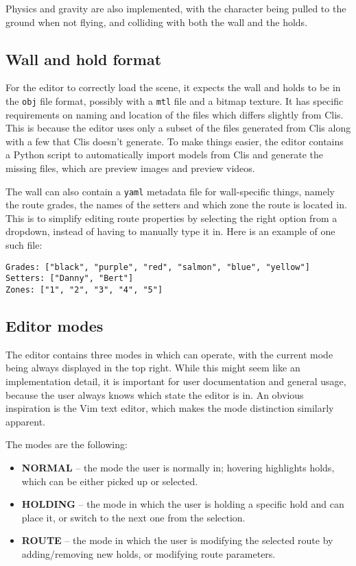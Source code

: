 Physics and gravity are also implemented, with the character being pulled to the ground when not flying, and colliding with both the wall and the holds.

\subsection{Wall and hold format}
For the editor to correctly load the scene, it expects the wall and holds to be in the \verb|obj| file format, possibly with a \verb|mtl| file and a bitmap texture.
It has specific requirements on naming and location of the files which differs slightly from Clis.
This is because the editor uses only a subset of the files generated from Clis along with a few that Clis doesn't generate.
To make things easier, the editor contains a Python script to automatically import models from Clis and generate the missing files, which are preview images and preview videos.

The wall can also contain a \verb|yaml| metadata file for wall-specific things, namely the route grades, the names of the setters and which zone the route is located in.
This is to simplify editing route properties by selecting the right option from a dropdown, instead of having to manually type it in.
Here is an example of one such file:

\begin{verbatim}
Grades: ["black", "purple", "red", "salmon", "blue", "yellow"]
Setters: ["Danny", "Bert"]
Zones: ["1", "2", "3", "4", "5"]
\end{verbatim}

\subsection{Editor modes}
The editor contains three modes in which can operate, with the current mode being always displayed in the top right.
While this might seem like an implementation detail, it is important for user documentation and general usage, because the user always knows which state the editor is in.
An obvious inspiration is the Vim text editor, which makes the mode distinction similarly apparent.

The modes are the following:

\begin{itemize}
	\item \textbf{NORMAL} -- the mode the user is normally in; hovering highlights holds, which can be either picked up or selected.
	\item \textbf{HOLDING} -- the mode in which the user is holding a specific hold and can place it, or switch to the next one from the selection.
	\item \textbf{ROUTE} -- the mode in which the user is modifying the selected route by adding/removing new holds, or modifying route parameters.
\end{itemize}

